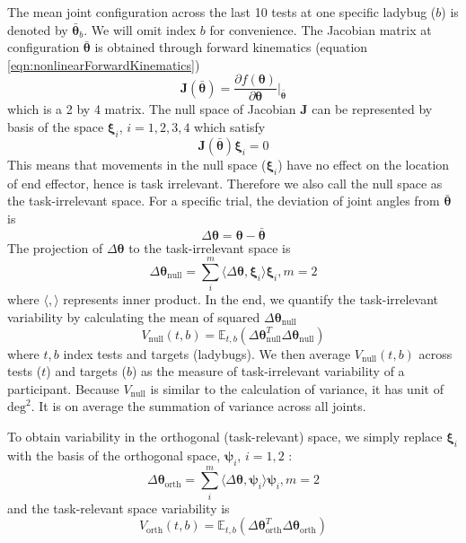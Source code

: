 The mean joint configuration across the last 10 tests at one specific ladybug ($ b $) is denoted by $ \bar{\bm{\theta}}_b $.
We will omit index $ b $ for convenience.
The Jacobian matrix at configuration $ \bar{\bm{\theta}} $ is obtained through forward kinematics (equation \ref{eqn:nonlinearForwardKinematics})
	\begin{equation}
	\bm{J}(\bar{\bm{\theta}}) = \frac{\partial f(\bm{\theta})}{\partial \bm{\theta}} \Big\rvert_{\bar{\bm{\theta}}}
	\end{equation}
which is a 2 by 4 matrix.
The null space of Jacobian $ \bm{J} $ can be represented by basis of the space $ \bm{\xi}_i $, $ i= 1,2,3,4 $ which satisfy
	\begin{equation}
	\bm{J}(\bar{\bm{\theta}}) \bm{\xi}_i = 0
	\end{equation}
This means that movements in the null space ($ \bm{\xi}_i $) have no effect on the location of end effector, hence is task irrelevant.
Therefore we also call the null space as the task-irrelevant space.
For a specific trial, the deviation of joint angles from $ \bar{\bm{\theta}} $ is
	\begin{equation}
	\Delta\bm{\theta} = \bm{\theta} - \bar{\bm{\theta}}
	\end{equation}
The projection of $ \Delta\bm{\theta} $ to the task-irrelevant space is
	\begin{equation}
	\Delta\bm{\theta}_{\text{null}} = \sum_i^m \langle \Delta\bm{\theta}, \bm{\xi}_i \rangle \bm{\xi}_i, m=2
	\end{equation}
where $ \langle,\rangle $ represents inner product.
In the end, we quantify the task-irrelevant variability by calculating the mean of squared $ \Delta\bm{\theta}_{\text{null}} $
	\begin{equation}\label{eqn:nullvar}
	V_{\text{null}}(t,b) = \mathbb{E}_{t,b} (\Delta\bm{\theta}_{\text{null}}^T\Delta\bm{\theta}_{\text{null}})
	\end{equation}
where $ t,b $ index tests and targets (ladybugs). 
We then average $ V_{\text{null}}(t,b) $ across tests ($ t $) and targets ($ b $) as the measure of task-irrelevant variability of a participant. 
Because $ V_{\text{null}} $ is similar to the calculation of variance, it has unit of $ \text{deg}^2 $.
It is on average the summation of variance across all joints.

To obtain variability in the orthogonal (task-relevant) space, we simply replace $ \bm{\xi}_i $ with the basis of the orthogonal space, $ \bm{\psi}_i $, $ i= 1,2 $  :
	\begin{equation}
	\Delta\bm{\theta}_{\text{orth}} = \sum_i^m \langle \Delta\bm{\theta}, \bm{\psi}_i \rangle \bm{\psi}_i, m=2
	\end{equation}
and the task-relevant space variability is
	\begin{equation}\label{eqn:taskvar}
	V_{\text{orth}}(t,b) = \mathbb{E}_{t,b} (\Delta\bm{\theta}_{\text{orth}}^T\Delta\bm{\theta}_{\text{orth}})
	\end{equation}

